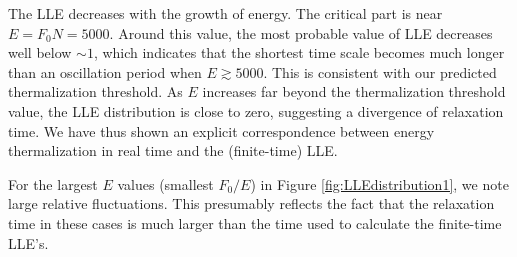 \documentclass[a4paper, onecolumn]{revtex4-1}
\begin{document}


The LLE decreases with the growth of energy. The critical part is near $E = F_0N = 5000$.  Around
this value, the most probable value of LLE decreases well below $\sim1$, which indicates that the
shortest time scale becomes much longer than an oscillation period when $E\gtrsim5000$.  This is
consistent with our predicted thermalization threshold.  As $E$ increases far beyond the
thermalization threshold value, the LLE distribution is close to zero, suggesting a divergence of
relaxation time.
%
We have thus shown an explicit correspondence between energy thermalization in real time and the
(finite-time) LLE.

For the largest $E$ values (smallest $F_0/E$) in Figure \ref{fig:LLEdistribution1}, we note large
relative fluctuations.  This presumably reflects the fact that the relaxation time in these cases is
much larger than the time used to calculate the finite-time LLE's.
\end{document}
